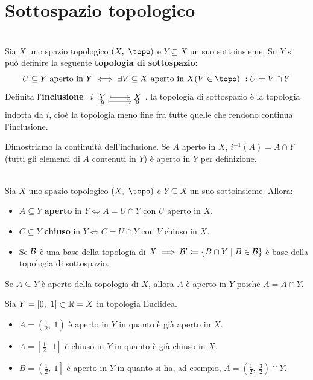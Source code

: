 \section{Sottospazio topologico} \label{sottospazi}
\begin{define}~{}\\
Sia $X$ uno spazio topologico $\left(X,\ \topo\right)$ e $Y\subseteq X$ un suo sottoinsieme. Su $Y$ si può definire la seguente \textbf{topologia di sottospazio}:
\begin{equation}
U\subseteq Y\text{ aperto in } Y \iff \exists V\subseteq X\text{ aperto in } X (V\in \topo)\ : U=V\cap Y
\end{equation}
Definita l'\textbf{inclusione} $\incltot{i}{Y}{X}{y}{y}$, la topologia di sottospazio è la topologia indotta da $i$, cioè la topologia meno fine fra tutte quelle che rendono continua l'inclusione.
\end{define}
\begin{demonstration}
Dimostriamo la continuità dell'inclusione. Se $A$ aperto in $X$, $i^{-1}\left(A\right)=A\cap Y$ (tutti gli elementi di $A$ contenuti in $Y$) è aperto in $Y$ per definizione.
\end{demonstration}
\begin{define}~{}\\
	Sia $X$ uno spazio topologico $\left(X,\ \topo\right)$ e $Y\subseteq X$ un suo sottoinsieme. Allora:
	\begin{itemize}
		\item $A\subseteq Y$ \textbf{aperto} in $Y\iff A=U\cap Y$ con $U$ aperto in $X$.
		\item $C\subseteq Y$ \textbf{chiuso} in $Y\iff C=U\cap Y$ con $V$ chiuso in $X$.
		\item Se $\mathcal{B}$ è una base della topologia di $X\implies \mathcal{B}'\coloneqq\left\{B\cap Y\mid B\in\mathcal{B}\right\}$ è base della topologia di sottospazio.
	\end{itemize}
\vspace{-3mm}
\end{define}
\begin{observe}
	Se $A\subseteq Y$ è aperto della topologia di $X$, allora $A$ è aperto in $Y$ poiché $A=A\cap Y$.
\end{observe}
\begin{examples} Sia $Y=\left[0,\ 1\right]\subset\realset=X$ in topologia Euclidea.
	\begin{itemize}
		\item $A=\left(\frac{1}{2},\ 1\right)$ è aperto in $Y$ in quanto è già aperto in $X$.
		\item $A=\left[\frac{1}{2},\ 1\right]$ è chiuso in $Y$ in quanto è già chiuso in $X$.
		\item $B=\left(\frac{1}{2},\ 1\right]$ è aperto in $Y$ in quanto si ha, ad esempio, $A=\left(\frac{1}{2},\ \frac{3}{2}\right)\cap Y$.
	\end{itemize}
\vspace{-3mm}
\end{examples}
